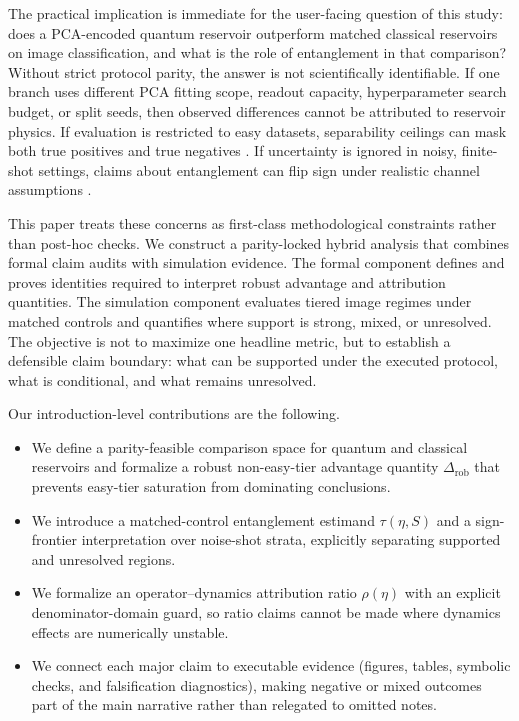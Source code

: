 \documentclass{article} %
\begin{document}
The practical implication is immediate for the user-facing question of this study: does a PCA-encoded quantum reservoir outperform matched classical reservoirs on image classification, and what is the role of entanglement in that comparison? Without strict protocol parity, the answer is not scientifically identifiable. If one branch uses different PCA fitting scope, readout capacity, hyperparameter search budget, or split seeds, then observed differences cannot be attributed to reservoir physics. If evaluation is restricted to easy datasets, separability ceilings can mask both true positives and true negatives \citep{arxiv_2212_08693,arxiv_2412_06758,arxiv_2601_22194}. If uncertainty is ignored in noisy, finite-shot settings, claims about entanglement can flip sign under realistic channel assumptions \citep{arxiv_2403_08998,arxiv_2209_05142,arxiv_2509_06873,arxiv_2601_23084}.

This paper treats these concerns as first-class methodological constraints rather than post-hoc checks. We construct a parity-locked hybrid analysis that combines formal claim audits with simulation evidence. The formal component defines and proves identities required to interpret robust advantage and attribution quantities. The simulation component evaluates tiered image regimes under matched controls and quantifies where support is strong, mixed, or unresolved. The objective is not to maximize one headline metric, but to establish a defensible claim boundary: what can be supported under the executed protocol, what is conditional, and what remains unresolved.

Our introduction-level contributions are the following.
\begin{itemize}
\item We define a parity-feasible comparison space for quantum and classical reservoirs and formalize a robust non-easy-tier advantage quantity $\Delta_{\mathrm{rob}}$ that prevents easy-tier saturation from dominating conclusions.
\item We introduce a matched-control entanglement estimand $\tau(\eta,S)$ and a sign-frontier interpretation over noise-shot strata, explicitly separating supported and unresolved regions.
\item We formalize an operator--dynamics attribution ratio $\rho(\eta)$ with an explicit denominator-domain guard, so ratio claims cannot be made where dynamics effects are numerically unstable.
\item We connect each major claim to executable evidence (figures, tables, symbolic checks, and falsification diagnostics), making negative or mixed outcomes part of the main narrative rather than relegated to omitted notes.
\end{itemize}
\end{document}
